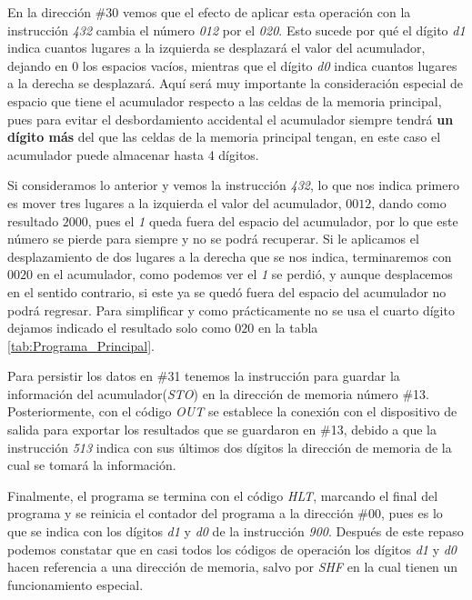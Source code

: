 \documentclass[letterpaper,12pt,oneside]{book}
\begin{document}
	En la dirección \#30 vemos que el efecto de aplicar esta operación con la instrucción \textit{432} cambia el número \textit{012} por
	el \textit{020}. Esto sucede por qué el dígito \textit{d1} indica cuantos lugares a la izquierda se desplazará el valor
	del acumulador, dejando en 0 los espacios vacíos, mientras que el dígito \textit{d0} indica cuantos lugares a la derecha se desplazará.
	Aquí será muy importante la consideración especial de espacio que tiene el acumulador respecto a las celdas de la memoria principal, pues
	para evitar el desbordamiento accidental el acumulador siempre tendrá \textbf{un dígito más} del que las celdas de la memoria principal tengan,
	en este caso el acumulador puede almacenar hasta 4 dígitos.
	
	Si consideramos lo anterior y vemos la instrucción \textit{432}, lo que nos indica primero es mover tres lugares a la izquierda
	el valor del acumulador, $0012$, dando como resultado $2000$, pues el \textit{1} queda fuera
	del espacio del acumulador, por lo que este número se pierde para siempre y no se podrá recuperar. Si le aplicamos el desplazamiento de dos lugares 	
	a la derecha que se nos indica, terminaremos con $0020$ en el acumulador, como podemos ver el \textit{1} se perdió, y aunque desplacemos
	en el sentido contrario, si este ya se quedó fuera del espacio del acumulador no podrá regresar. Para simplificar y como prácticamente no se usa el cuarto dígito dejamos indicado el resultado solo como $020$ en la tabla \ref{tab:Programa_Principal}.
	
	
	Para persistir los datos  en \#31 tenemos la instrucción para guardar la información del acumulador(\textit{STO}) en la dirección de memoria número
	\#13. Posteriormente, con el código  \textit{OUT} se establece la conexión con el dispositivo de salida para exportar los resultados
	que se guardaron en \#13, debido a que la instrucción \textit{513} indica con sus últimos dos dígitos la dirección
	de memoria de la cual se tomará la información.
 
    Finalmente, el programa se termina con el código  \textit{HLT}, marcando el
	final del programa y se reinicia el contador del programa
	a la dirección \#00, pues es lo que se indica con los dígitos \textit{d1} y \textit{d0} de la instrucción \textit{900}. Después de este repaso podemos constatar que en casi todos los códigos de operación los dígitos \textit{d1} y \textit{d0} hacen
	referencia a una dirección de memoria, salvo por \textit{SHF} en la cual tienen un funcionamiento especial.
	
\end{document}
